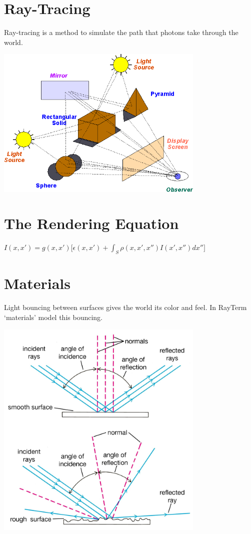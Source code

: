 \documentclass[alleghenyposter]{betterposter}
\begin{document}
{}{

\section{Ray-Tracing}
Ray-tracing is a method to simulate the path that photons take through the world.

\begin{center}
\includegraphics[width=0.75\textwidth]{img/world}
\end{center}

\section{The Rendering Equation}
\vspace{-1.5em}
\begin{center}
$I(x, x') = g(x, x') \Big[\epsilon(x, x') + \int_{S} \rho(x, x',x'')I(x', x'')dx''\Big]$
\end{center}

\section{Materials}
Light bouncing between surfaces gives the world its color and feel.
In RayTerm `materials' model this bouncing.

\begin{center}
\includegraphics[width=0.75\textwidth]{img/surface}
\end{center}

}
\end{document}
